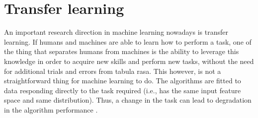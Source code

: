\section{Transfer learning}\label{sec:transfer_learning}
  \par An important research direction in machine learning nowadays is transfer learning. If humans and machines are able to learn how to perform a task, one of the thing that separates humans from machines is the ability to leverage this knowledge in order to acquire new skills and perform new tasks, without the need for additional trials and errors from tabula rasa. This however, is not a straightforward thing for machine learning to do. The algorithms are fitted to data responding directly to the task required (i.e., has the same input feature space and same distribution). Thus, a change in the task can lead to degradation in the algorithm performance \citep{shimodaira2000improving,pan2009survey,weiss2016survey,dtl2018survey}.



